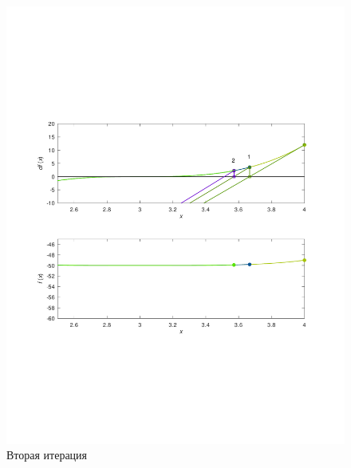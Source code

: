 \documentclass[a4paper,12pt]{article}
\begin{document}
    \begin{figure}[H]
        \centering
        \includegraphics[scale=0.4]{2secantitter.pdf}
        \caption{Вторая итерация}
    \end{figure}
\end{document}
